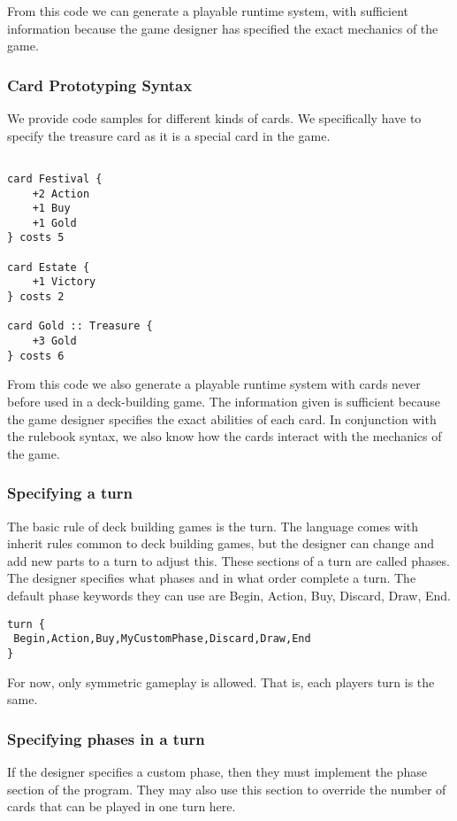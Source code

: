 \documentclass{acm_proc_article-sp}
\begin{document}
From this code we can generate a playable runtime system, with sufficient information
because the game designer has specified the exact mechanics of the game.

\subsubsection{Card Prototyping Syntax}
We provide code samples for different kinds of cards. We specifically have to specify the
treasure card as it is a special card in the game.

\begin{verbatim}

card Festival {
    +2 Action
    +1 Buy
    +1 Gold
} costs 5

card Estate {
    +1 Victory
} costs 2

card Gold :: Treasure {
    +3 Gold
} costs 6
\end{verbatim}

From this code we also generate a playable runtime system with cards never before
used in a deck-building game. The information given is sufficient because the
game designer specifies the exact abilities of each card. In conjunction with the
rulebook syntax, we also know how the cards interact with the mechanics of the game.

\subsubsection{Specifying a turn}
The basic rule of deck building games is the turn. The language comes with inherit rules common to deck building games, but the designer can change and add new parts to a turn to adjust this. These sections of a turn are called phases. The designer specifies what phases and in what order complete a turn. The default phase keywords they can use are Begin, Action, Buy, Discard, Draw, End. 
\begin{verbatim}
turn {
 Begin,Action,Buy,MyCustomPhase,Discard,Draw,End 
}
\end{verbatim}

For now, only symmetric gameplay is allowed. That is, each players turn is the same.

\subsubsection{Specifying phases in a turn}
If the designer specifies a custom phase, then they must implement the phase section of the program. They may also use this section to override the number of cards that can be played in one turn here.
\end{document}
